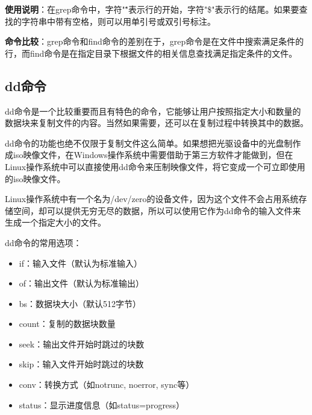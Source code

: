 \documentclass[12pt,UTF8]{ctexbook}
\begin{document}
\textbf{使用说明}：在grep命令中，字符"\^"表示行的开始，字符"\$"表示行的结尾。如果要查找的字符串中带有空格，则可以用单引号或双引号标注。

\textbf{命令比较}：grep命令和find命令的差别在于，grep命令是在文件中搜索满足条件的行，而find命令是在指定目录下根据文件的相关信息查找满足指定条件的文件。

\subsection{dd命令}
dd命令是一个比较重要而且有特色的命令，它能够让用户按照指定大小和数量的数据块来复制文件的内容。当然如果需要，还可以在复制过程中转换其中的数据。

dd命令的功能也绝不仅限于复制文件这么简单。如果想把光驱设备中的光盘制作成iso映像文件，在Windows操作系统中需要借助于第三方软件才能做到，但在Linux操作系统中可以直接使用dd命令来压制映像文件，将它变成一个可立即使用的iso映像文件。

Linux操作系统中有一个名为/dev/zero的设备文件，因为这个文件不会占用系统存储空间，却可以提供无穷无尽的数据，所以可以使用它作为dd命令的输入文件来生成一个指定大小的文件。

dd命令的常用选项：
\begin{itemize}
    \item if：输入文件（默认为标准输入）
    \item of：输出文件（默认为标准输出）
    \item bs：数据块大小（默认512字节）
    \item count：复制的数据块数量
    \item seek：输出文件开始时跳过的块数
    \item skip：输入文件开始时跳过的块数
    \item conv：转换方式（如notrunc, noerror, sync等）
    \item status：显示进度信息（如status=progress）
\end{itemize}
\end{document}
